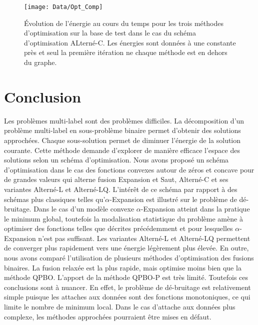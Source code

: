 \documentclass[../main/These_Mathias_Paget.tex]{subfiles}
\begin{document}
\begin{figure}
\centering
\texttt{[image: Data/Opt\_Comp]}
\caption{Évolution de l’énergie au cours du temps pour les trois méthodes d'optimisation sur la base de test dans le cas du schéma d'optimisation ALterné-C. Les énergies sont données à une constante près et seul la première itération ne chaque méthode est en dehors du graphe.}
\label{fig:comp_opt__}
\end{figure}

\section{Conclusion}

	Les problèmes multi-label sont des problèmes difficiles. La décomposition d'un problème multi-label en sous-problème binaire permet d'obtenir des solutions approchées. Chaque sous-solution permet de diminuer l’énergie de la solution courante. Cette méthode demande d'explorer de manière efficace l'espace des solutions selon un schéma d'optimisation. Nous avons proposé un schéma d'optimisation dans le cas des fonctions convexes autour de zéros et concave pour de grandes valeurs qui alterne fusion Expansion et Saut, Alterné-C et ses variantes Alterné-L et Alterné-LQ. L’intérêt de ce schéma par rapport à des schémas plus classiques telles qu'$\alpha$-Expansion est illustré sur le problème de dé-bruitage. Dans le cas d'un modèle convexe $\alpha$-Expansion atteint dans la pratique le minimum global, toutefois la modalisation statistique du problème amène à optimiser des fonctions telles que décrites précédemment et pour lesquelles $\alpha$-Expansion n'est pas suffisant. Les variantes Alterné-L et Alterné-LQ permettent de converger plus rapidement vers une énergie légèrement plus élevée. En outre, nous avons comparé l'utilisation de plusieurs méthodes d'optimisation des fusions binaires. La fusion relaxée est la plus rapide, mais optimise moins bien que la méthode QPBO. L'apport de la méthode QPBO-P est très limité. Toutefois ces conclusions sont à nuancer. En effet, le problème de dé-bruitage est relativement simple puisque les attaches aux données sont des fonctions monotoniques, ce qui limite le nombre de minimum local. Dans le cas d'attache aux données plus complexe, les méthodes approchées pourraient être mises en défaut.

%



\end{document}
